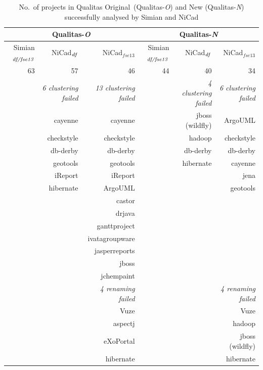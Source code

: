 \documentclass{sig-alternate-05-2015}
\begin{document}
\begin{table}
	\centering
	\caption{No.~of projects in Qualitas Original~(Qualitas-\textit{O}) and New (Qualitas-\textit{N}) successfully analysed by Simian and NiCad}
	\label{tab:projects_missing}
	\small
	\begin{tabular}{r|r|r|r|r|r}
		\hline
		\multicolumn{3}{c|}{Qualitas-\textit{O}} & \multicolumn{3}{c}{Qualitas-\textit{N}} \\
		\hline
		Simian$_{\textrm{\textit{df/fse13}}}$ & NiCad$_{\textrm{\textit{df}}}$ & NiCad$_{fse13}$ & Simian$_{\textrm{\textit{df/fse13}}}$ & NiCad$_{\textrm{\textit{df}}}$ & NiCad$_{fse13}$ \\ \hline
		63	& 57 & 46 & 44 & 40 & 34 \\
		\hline
		& \textit{6 clustering failed} & \textit{13 clustering failed} & & \textit{4 clustering failed} & \textit{6 clustering failed} \\
		& cayenne   & cayenne 	& & jboss (wildfly) & ArgoUML \\
		& checkstyle & checkstyle & & hadoop & checkstyle \\
		& db-derby 	& db-derby 	& & db-derby & db-derby \\
		& geotools 	& geotools  & & hibernate & cayenne \\
		& iReport 	& iReport   & & & jena \\
		& hibernate & ArgoUML 	& & & geotools \\
		&			& castor 		& & & \\
		&			& drjava 		& & & \\
		&			& ganttproject 	& & & \\
		&			& ivatagroupware & & &  \\
		&			& jasperreports & & & \\
		&			& jboss 		& & & \\
		&			& jchempaint 	& & & \\
		\hline
		& 			&  \textit{4 renaming failed} & & & \textit{4 renaming failed} \\
		&			& Vuze 		& & & Vuze \\
		&			& aspectj 	& & & hadoop \\
		&			& eXoPortal 	& & & jboss (wildfly) \\
		&			&  hibernate 	& & & hibernate \\
		\hline
	\end{tabular}
\end{table}
\end{document}
